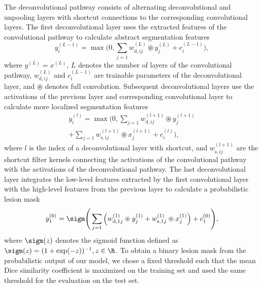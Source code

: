 The deconvolutional pathway consists of alternating deconvolutional and
unpooling layers with shortcut connections to the corresponding
convolutional layers. The first deconvolutional layer uses the extracted
features of the convolutional pathway to calculate abstract segmentation
features
\begin{equation}
y^{(L-1)}_i = \max\Bigg(0, \sum_{j=1}w^{(L)}_{\text{d},ij}\circledast
y^{(L)}_j + c^{(L-1)}_{i}\Bigg),
\end{equation}
where $y^{(L)} = x^{(L)}$, $L$ denotes the number of layers of the convolutional
pathway, $w^{(L)}_{\text{d},ij}$ and $c^{(L-1)}_i$ are trainable parameters of
the deconvolutional layer, and $\circledast$ denotes full convolution. Subsequent
deconvolutional layers use the activations of the previous layer
and corresponding convolutional layer to calculate more localized segmentation
features
\begin{multline}
y^{(l)}_i = \max\Bigg(0, 
\sum_{j=1}w^{(l+1)}_{\text{d},ij}\circledast y^{(l+1)}_j\\
+ \sum_{j=1} w^{(l+1)}_{\text{s},ij}\circledast x^{(l+1)}_j +
c^{(l)}_i\Bigg),
\end{multline}
where $l$ is the index of a deconvolutional layer with shortcut, and
$w^{(l+1)}_{\text{s},ij}$ are the shortcut filter kernels connecting the
activations of the convolutional pathway with the activations of the
deconvolutional pathway. The last deconvolutional layer integrates the low-level
features extracted by the first convolutional layer with the high-level features
from the previous layer to calculate a probabilistic lesion mask
\begin{equation}
y^{(0)}_1 = \sigm\Bigg(\sum_{j=1}\Big(w^{(1)}_{\text{d},1j}\circledast
y^{(1)}_j +
w^{(1)}_{\text{s},1j}\circledast x^{(1)}_j\Big) + c^{(0)}_1\Bigg),
\end{equation}
where $\sigm(z)$ denotes the sigmoid function defined as $\sigm(z) = (1 +
\exp(-z))^{-1}, z \in \R$. To obtain a binary lesion mask from the probabilistic
output of our model, we chose a fixed threshold such that the mean Dice
similarity coefficient \cite{dice1945} is maximized on the training set
and used the same threshold for the evaluation on the test set.

